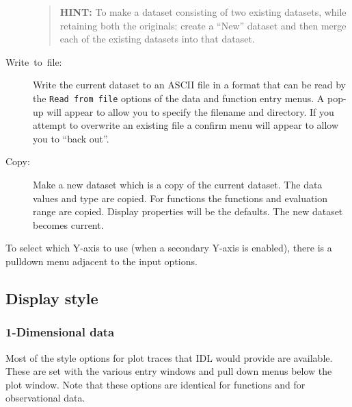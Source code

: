 \documentclass[11pt,twoside,english]{article}
\begin{document}
\begin{description}
\begin{quote}
  \textsf{\textbf{HINT:}} \textsf{To make a dataset consisting of two
    existing datasets, while retaining both the originals: create a
    {}``New'' dataset and then merge each of the existing datasets into
    that dataset.}
\end{quote}
\item [Write~to~file:] Write the current dataset to an ASCII file in a
  format that can be read by the \texttt{Read from file} options of the
  data and function entry menus. A pop-up will appear to allow you to
  specify the filename and directory. If you attempt to overwrite an
  existing file a confirm menu will appear to allow you to {}``back
  out''.
\item[Copy:] Make a new dataset which is a copy of the current
  dataset. The data values and type are copied. For functions the
  functions and evaluation range are copied. Display properties will be
  the defaults. The new dataset becomes current.
\end{description}
To select which Y-axis to use (when a secondary Y-axis is enabled),
there is a pulldown menu adjacent to the input options.

\subsection{Display style}


\subsubsection{1-Dimensional data}

Most of the style options for plot traces that IDL would provide are
available. These are set with the various entry windows and pull down
menus below the plot window. Note that these options are identical for
functions and for observational data.
\end{document}
